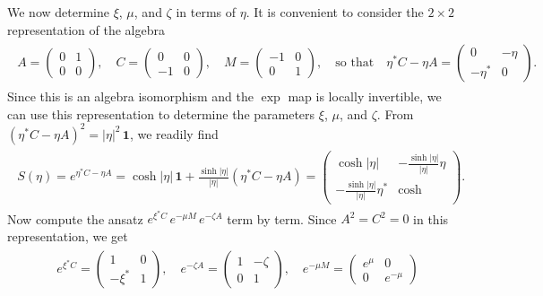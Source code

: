 \documentclass[../QFT_main.tex]{subfiles}
\begin{document}
\begin{mytheorem}
We now determine $\xi$, $\mu$, and $\zeta$ in terms of $\eta$.
It is convenient to consider the $2\times2$ representation of the algebra 
\begin{align}
\begin{aligned}
    A=\begin{pmatrix}0&1\\0&0\end{pmatrix},\quad
    C=\begin{pmatrix}0&0\\ -1&0\end{pmatrix},\quad
    M=\begin{pmatrix}-1&0\\0&1\end{pmatrix}, \quad \text{so that}\quad \eta^*C-\eta A=\begin{pmatrix}0&-\eta\\-\eta^*&0\end{pmatrix}.
\end{aligned}\end{align}
Since this is an algebra isomorphism and the $\exp$ map is locally invertible, we can use this representation to determine the parameters $\xi$, $\mu$, and $\zeta$.
From $(\eta^*C-\eta A)^2=|\eta|^2\,\mathbf 1$, we readily find
{\small
\begin{align}
\begin{aligned}
    S(\eta)=e^{\eta^*C-\eta A}=\cosh |\eta|\,\mathbf 1+\frac{\sinh |\eta|}{|\eta|}(\eta^*C-\eta A)=\begin{pmatrix}\cosh |\eta| & -\tfrac{\sinh |\eta|}{|\eta|}\eta\\[1mm]-\tfrac{\sinh |\eta|}{|\eta|}\eta^* & \cosh \end{pmatrix}. 
\end{aligned}\end{align}}
Now compute the ansatz $e^{\xi^* C}\,e^{-\mu M}\,e^{-\zeta A}$ term by term.
Since $A^2=C^2=0$ in this representation, we get
{\small\begin{align}
\begin{aligned}
    &e^{\xi^* C}=\begin{pmatrix}1&0\\-\xi^*&1\end{pmatrix},\quad
    e^{-\zeta A}=\begin{pmatrix}1&-\zeta\\0&1\end{pmatrix},\quad
    e^{-\mu M}=\begin{pmatrix}e^\mu&0\\0&e^{-\mu}\end{pmatrix}\\[3pt]

\end{aligned}
\end{align}}
\end{mytheorem}
\end{document}
